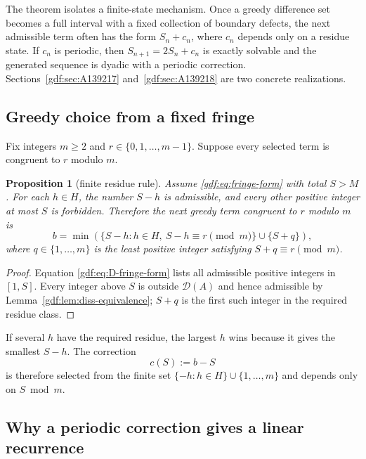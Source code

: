 \documentclass[11pt,a4paper]{article}
\numberwithin{equation}{section}
\newtheorem{proposition}[theorem]{Proposition}
\theoremstyle{definition}
\theoremstyle{remark}
\theoremstyle{plain}
\newcommand{\cD}{\mathcal D}
\begin{document}
The theorem isolates a finite-state mechanism.  Once a greedy difference set
becomes a full interval with a fixed collection of boundary defects, the next
admissible term often has the form $S_n+c_n$, where $c_n$ depends only on a
residue state.  If $c_n$ is periodic, then $S_{n+1}=2S_n+c_n$ is exactly
solvable and the generated sequence is dyadic with a periodic correction.
Sections~\ref{gdf:sec:A139217} and~\ref{gdf:sec:A139218} are two concrete
realizations.

\subsection{Greedy choice from a fixed fringe}

Fix integers $m\ge2$ and $r\in\{0,1,\dots,m-1\}$.  Suppose every selected term
is congruent to $r$ modulo $m$.

\begin{proposition}[finite residue rule]\label{gdf:prop:residue-rule}
Assume \eqref{gdf:eq:fringe-form} with total $S>M$.  For each $h\in H$, the number
$S-h$ is admissible, and every other positive integer at most $S$ is
forbidden.  Therefore the next greedy term congruent to $r$ modulo $m$ is
\begin{equation}\label{gdf:eq:greedy-from-fringe}
 b=\min\left(
   \{S-h:h\in H,\ S-h\equiv r\pmod m\}
   \cup\{S+q\}\right),
\end{equation}
where $q\in\{1,\dots,m\}$ is the least positive integer satisfying
$S+q\equiv r\pmod m$.
\end{proposition}

\begin{proof}
Equation \eqref{gdf:eq:D-fringe-form} lists all admissible positive integers in
$[1,S]$.  Every integer above $S$ is outside $\cD(A)$ and hence admissible by
Lemma~\ref{gdf:lem:diss-equivalence}; $S+q$ is the first such integer in the
required residue class.
\end{proof}

If several $h$ have the required residue, the largest $h$ wins because it
gives the smallest $S-h$.  The correction
\begin{equation}\label{gdf:eq:c-def}
 c(S):=b-S
\end{equation}
is therefore selected from the finite set
$\{-h:h\in H\}\cup\{1,\dots,m\}$ and depends only on $S\bmod m$.

\subsection{Why a periodic correction gives a linear recurrence}\label{gdf:sec:periodic}
\end{document}
